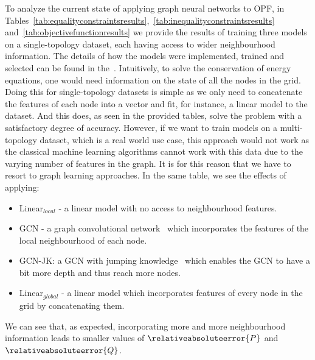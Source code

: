 To analyze the current state of applying graph neural networks to
OPF, in Tables~\ref{tab:equalityconstraintsresults},~\ref{tab:inequalityconstraintsresults} and~\ref{tab:objectivefunctionresults}
we provide the results of training three models on a single-topology dataset, each having access to
wider neighbourhood information.
The details of how the models were implemented, trained and selected can be found in the~.
Intuitively, to solve the conservation of energy equations, one would need information on the
state of all the nodes in the grid.
Doing this for single-topology datasets is simple as we only need to concatenate the
features of each node into a vector and fit, for instance, a linear model to the dataset.
And this does, as seen in the provided tables, solve the problem with a satisfactory degree of accuracy.
However, if we want to train models on a multi-topology dataset, which is a real world use case,
this approach would not work as the classical machine learning algorithms cannot work with
this data due to the varying number of features in the graph.
It is for this reason that we have to resort to graph learning approaches.
In the same table, we see the effects of applying:

\begin{itemize}
    \item Linear$_{local}$ - a linear model with no access to neighbourhood features.
    \item GCN - a graph convolutional network~\cite{kipf2016semi} which incorporates the features of the
    local neighbourhood of each node.
    \item GCN-JK: a GCN with jumping knowledge~\cite{xu2018representation} which enables the GCN to have a bit
    more depth and thus reach more nodes.
    \item Linear$_{global}$ - a linear model which incorporates features of every node in the grid
    by concatenating them.
\end{itemize}

\noindent We can see that, as expected, incorporating more and more neighbourhood information leads to
smaller values of $\relativeabsoluteerror{P}$ and $\relativeabsoluteerror{Q}$.

